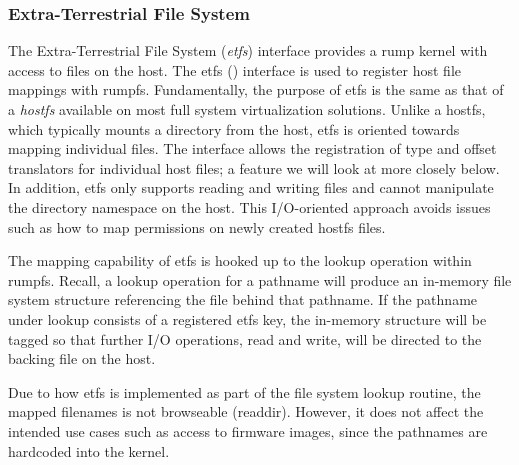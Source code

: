 \subsubsection{Extra-Terrestrial File System}
\label{sect:etfs}

The Extra-Terrestrial File System (\textit{etfs}) interface provides
a rump kernel with access to files on the host.  The
etfs () interface is used
to register host file mappings with rumpfs.  Fundamentally, the
purpose of etfs is the same as that of a \textit{hostfs} available
on most full system virtualization solutions.  Unlike a hostfs,
which typically mounts a directory from the host, etfs is oriented
towards mapping individual files.  The interface allows the
registration of type and offset translators for individual host
files; a feature we will look at more closely below.  In addition,
etfs only supports reading and writing files and cannot manipulate
the directory namespace on the host.  This I/O-oriented approach
avoids issues such as how to map permissions on newly created hostfs
files.

The mapping capability of etfs is hooked up to the lookup operation
within rumpfs.  Recall, a lookup operation for a pathname will
produce an in-memory file system structure referencing the file
behind that pathname.  If the pathname under lookup consists of a
registered etfs key, the in-memory structure will be tagged so that
further I/O operations, \ie read and write, will be directed to
the backing file on the host.

Due to how etfs is implemented as part of the file system lookup routine,
the mapped filenames is not browseable (\ie readdir).  However, it does
not affect the intended use cases such as access to firmware images,
since the pathnames are hardcoded into the kernel.

